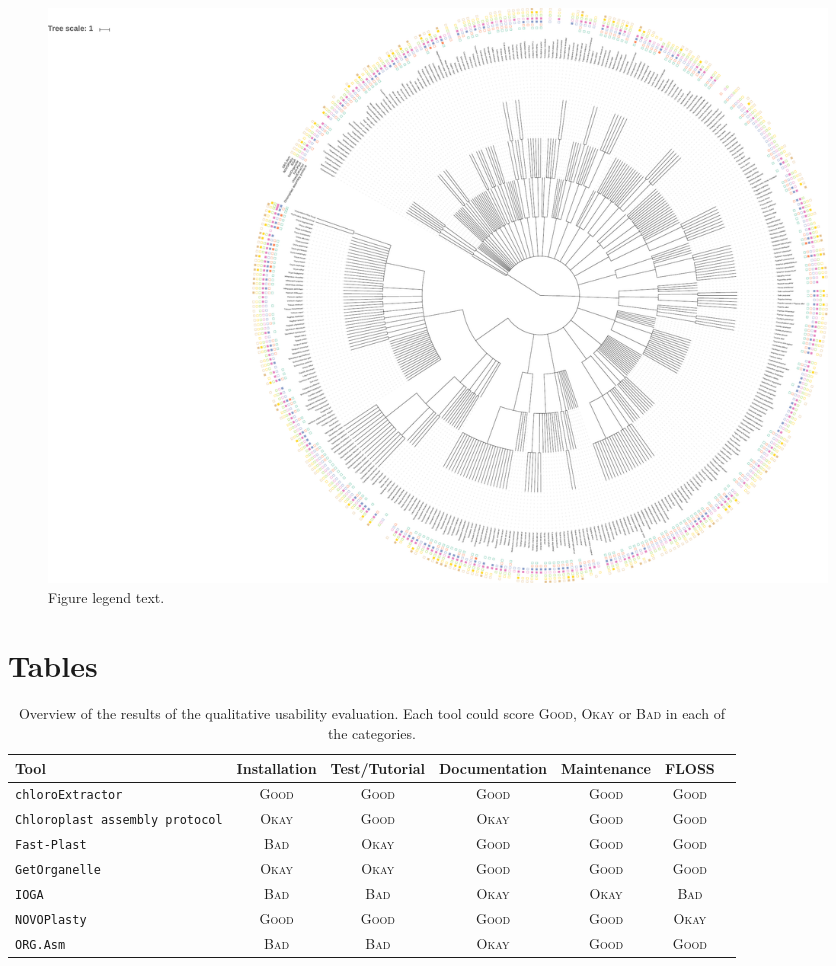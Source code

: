 \documentclass{bmcart}
\newcommand{\formatprogramnames}[1]{\texttt{#1}}
\newcommand{\ce}{\formatprogramnames{chloroExtractor}}
\newcommand{\oa}{\formatprogramnames{ORG.Asm}}
\newcommand{\fp}{\formatprogramnames{Fast-Plast}}
\newcommand{\ioga}{\formatprogramnames{IOGA}}
\newcommand{\np}{\formatprogramnames{NOVOPlasty}}
\newcommand{\go}{\formatprogramnames{GetOrganelle}}
\newcommand{\cassp}{\formatprogramnames{Chloroplast assembly protocol}}
\newcommand{\ok}{\textsc{Okay}}
\newcommand{\bad}{\textsc{Bad}}
\newcommand{\good}{\textsc{Good}}
\begin{document}
\begin{backmatter}
\begin{figure}[h!]
  \includegraphics[width=\textwidth]{plots/real_datasets_tree.pdf}
  \caption{
      Figure legend text.}
      \end{figure}


\section*{Tables}
\begin{table}[]
    \centering
    \caption{Overview of the results of the qualitative usability evaluation. Each tool 
    could score \good{}, \ok{} or \bad{} in each of the categories.}
    \label{tab:resultsQual}
\begin{tabular}{p{3cm}cccccc}   
Tool & Installation & Test/Tutorial & Documentation & Maintenance & FLOSS\\                           \hline \ce{}     &  \good{}  &  \good{}  &  \good{}  &  \good{}  &  \good{} \\
\cassp{}  &  \ok{}    &  \good{}  &  \ok{}    &  \good{}  &  \good{} \\
\fp{}     &  \bad{}   &  \ok{}    &  \good{}  &  \good{}  &  \good{} \\
\go{}     &  \ok{}    &  \ok{}    &  \good{}  &  \good{}  &  \good{} \\
\ioga{}   &  \bad{}   &  \bad{}   &  \ok{}    &  \ok{}    &  \bad{}  \\
\np{}     &  \good{}  &  \good{}  &  \good{}  &  \good{}  &  \ok{}   \\
\oa{}     &  \bad{}   &  \bad{}   &  \ok{}    &  \good{}  &  \good{} \\ \hline
\end{tabular}      
\end{table}


\end{backmatter}
\end{document}
